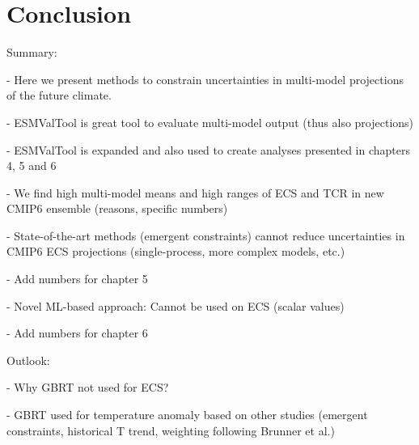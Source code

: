 


\chapter{Conclusion}
\label{ch:07:conclusion}

Summary:

- Here we present methods to constrain uncertainties in multi-model projections
of the future climate.

- ESMValTool is great tool to evaluate multi-model output (thus also
projections)

- ESMValTool is expanded and also used to create analyses presented in chapters
4, 5 and 6

- We find high multi-model means and high ranges of ECS and TCR in new CMIP6
ensemble (reasons, specific numbers)

- State-of-the-art methods (emergent constraints) cannot reduce uncertainties
in CMIP6 ECS projections (single-process, more complex models, etc.)

- Add numbers for chapter 5

- Novel ML-based approach: Cannot be used on ECS (scalar values)

- Add numbers for chapter 6


Outlook:

- Why GBRT not used for ECS?

- GBRT used for temperature anomaly based on other studies (emergent
constraints, historical T trend, weighting following Brunner et al.)
